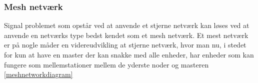 \subsubsection*{Mesh netværk}
Signal problemet som opstår ved at anvende et stjerne netværk kan løses ved at anvende en netværks type bedst kendet som et mesh netværk.
Et mest netværk er på nogle måder en videreudvikling at stjerne netværk, hvor man nu, i stedet for kun at have en master der kan snakke med alle enheder, har enheder som kan fungere som mellemstationer mellem de yderste noder og masteren \ref{meshnetworkdiagram}
